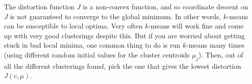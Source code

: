 \documentclass{article}
\begin{document}
The distortion function $J$ is a non-convex function, and so coordinate 
descent on $J$ is not guaranteed to converge to the global minimum.  In other words, $k$-means
can be susceptible to local optima.  Very often $k$-means will work fine and come up with
very good clusterings despite this.  But if you are worried about getting stuck in bad 
local minima, one common thing to do is run $k$-means many times (using different
random initial values for the cluster centroids $\mu_j$).  Then, out of all the
different clusterings found, pick the one that gives the lowest distortion $J(c,\mu)$. 
\end{document}
